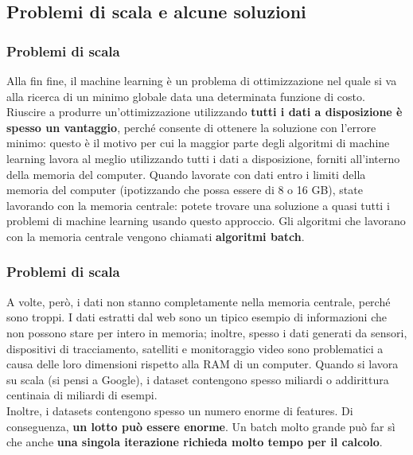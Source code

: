 \subsection[Problemi di scala e alcune soluzioni]{Problemi di scala e alcune soluzioni}
\begin{frame}
	
	\frametitle{Problemi di scala}
	
		Alla fin fine, il machine learning è un problema di ottimizzazione nel quale si va alla ricerca di un minimo globale data una determinata funzione di costo. Riuscire a produrre un’ottimizzazione utilizzando \textbf{tutti i dati a disposizione è spesso un vantaggio}, perché consente di ottenere la soluzione con l’errore minimo: questo è il motivo per cui la maggior parte degli algoritmi di machine learning lavora al meglio utilizzando tutti i dati a disposizione, forniti all’interno della memoria del computer.
		\newlinedouble		
		Quando lavorate con dati entro i limiti della memoria del computer (ipotizzando che possa essere di 8 o 16 GB), state lavorando con la memoria centrale: potete trovare una soluzione a quasi tutti i problemi di machine learning usando questo approccio. Gli algoritmi che lavorano con la memoria centrale vengono chiamati \textbf{algoritmi batch}. 

\end{frame}


\begin{frame}
	
	\frametitle{Problemi di scala}
	
		A volte, però, i dati non stanno completamente nella memoria centrale, perché sono troppi. I dati estratti dal web sono un tipico esempio di informazioni che non possono stare per intero in memoria; inoltre, spesso i dati generati da sensori, dispositivi di tracciamento, satelliti e monitoraggio video sono problematici a causa delle loro dimensioni rispetto alla RAM di un computer.
		\newlinedouble
		Quando si lavora su scala (si pensi a Google), i dataset contengono spesso miliardi o addirittura centinaia di miliardi di esempi.\\
		Inoltre, i datasets contengono spesso un numero enorme di features.
		\newlinedouble
		Di conseguenza, \textbf{un lotto può essere enorme}. Un batch molto grande può far sì che anche \textbf{una singola iterazione richieda molto tempo per il calcolo}.

\end{frame}



